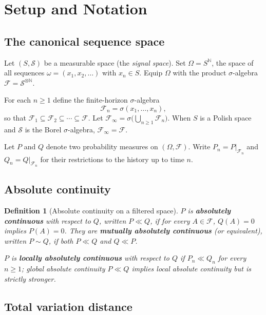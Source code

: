 \documentclass[12pt]{article}
\newtheorem{definition}[theorem]{Definition}
\begin{document}
\section{Setup and Notation}
\label{sec:setup}

\subsection{The canonical sequence space}

Let $(S, \mathscr{S})$ be a measurable space (the \emph{signal space}).  Set
$\Omega = S^{\mathbb{N}}$, the space of all sequences $\omega =
(x_1, x_2, \ldots)$ with $x_n \in S$.  Equip $\Omega$ with the product
$\sigma$-algebra $\mathscr{F} = \mathscr{S}^{\otimes\mathbb{N}}$.

For each $n \geq 1$ define the finite-horizon $\sigma$-algebra
\[
\mathscr{F}_n = \sigma(x_1, \ldots, x_n),
\]
so that $\mathscr{F}_1 \subseteq \mathscr{F}_2 \subseteq \cdots \subseteq
\mathscr{F}$.  Let $\mathscr{F}_\infty = \sigma\bigl(\bigcup_{n \geq 1}
\mathscr{F}_n\bigr)$.  When $S$ is a Polish space and $\mathscr{S}$ is the
Borel $\sigma$-algebra, $\mathscr{F}_\infty = \mathscr{F}$.

Let $P$ and $Q$ denote two probability measures on $(\Omega, \mathscr{F})$.
Write $P_n = P|_{\mathscr{F}_n}$ and $Q_n = Q|_{\mathscr{F}_n}$ for their
restrictions to the history up to time $n$.

\subsection{Absolute continuity}

\begin{definition}[Absolute continuity on a filtered space]
$P$ is \textbf{absolutely continuous} with respect to $Q$, written $P \ll Q$,
if for every $A \in \mathscr{F}$, $Q(A) = 0$ implies $P(A) = 0$.  They are
\textbf{mutually absolutely continuous} (or \emph{equivalent}), written
$P \sim Q$, if both $P \ll Q$ and $Q \ll P$.

$P$ is \textbf{locally absolutely continuous} with respect to $Q$ if
$P_n \ll Q_n$ for every $n \geq 1$; global absolute continuity
$P \ll Q$ implies local absolute continuity but is strictly stronger.
\end{definition}

\subsection{Total variation distance}
\end{document}
